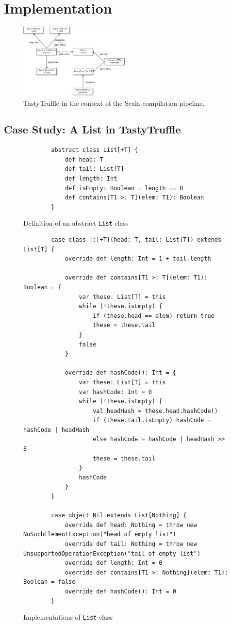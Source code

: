\chapter{Implementation}



\begin{figure}[H]
	\centering
	\includegraphics[width=0.5\textwidth]{figures/tastytruffle-pipeline.png}
	\caption{TastyTruffle in the context of the Scala compilation pipeline.}
\end{figure}

\section{Case Study: A List in TastyTruffle}

\begin{figure}[H]
	\begin{verbatim}
		abstract class List[+T] {
			def head: T
			def tail: List[T]
			def length: Int
			def isEmpty: Boolean = length == 0
			def contains[T1 >: T](elem: T1): Boolean
		}
	\end{verbatim}
	\caption{Definition of an abstract \texttt{List} class}
\end{figure}

\begin{figure}[H]
	\begin{verbatim}
		case class ::[+T](head: T, tail: List[T]) extends List[T] {
			override def length: Int = 1 + tail.length
			
			override def contains[T1 >: T](elem: T1): Boolean = {
				var these: List[T] = this
				while (!these.isEmpty) {
					if (these.head == elem) return true
					these = these.tail
				}
				false
			}
			
			override def hashCode(): Int = {
				var these: List[T] = this
				var hashCode: Int = 0
				while (!these.isEmpty) {
					val headHash = these.head.hashCode()
					if (these.tail.isEmpty) hashCode = hashCode | headHash
					else hashCode = hashCode | headHash >> 8
					these = these.tail
				}
				hashCode
			}
		}
		
		case object Nil extends List[Nothing] {
			override def head: Nothing = throw new NoSuchElementException("head of empty list")
			override def tail: Nothing = throw new UnsupportedOperationException("tail of empty list")
			override def length: Int = 0
			override def contains[T1 >: Nothing](elem: T1): Boolean = false
			override def hashCode(): Int = 0
		}
	\end{verbatim}
	\caption{Implementations of \texttt{List} class}
\end{figure}

